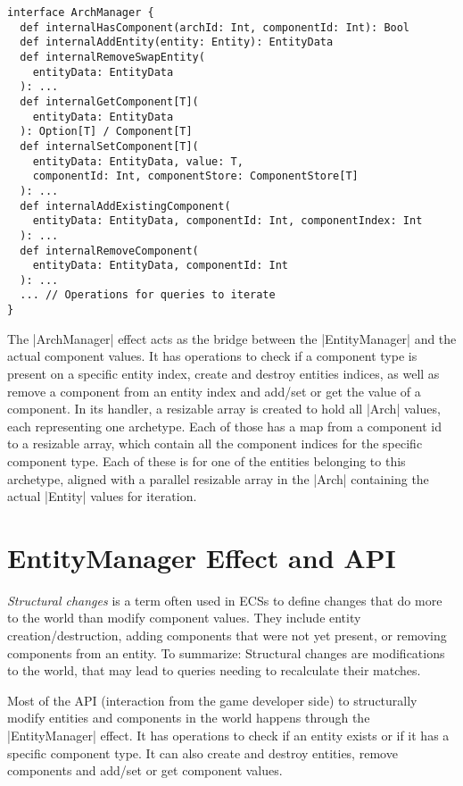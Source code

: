 \begin{lstlisting}[caption=ArchManager signature]
interface ArchManager {
  def internalHasComponent(archId: Int, componentId: Int): Bool
  def internalAddEntity(entity: Entity): EntityData
  def internalRemoveSwapEntity(
    entityData: EntityData
  ): ...
  def internalGetComponent[T](
    entityData: EntityData
  ): Option[T] / Component[T]
  def internalSetComponent[T](
    entityData: EntityData, value: T,
	componentId: Int, componentStore: ComponentStore[T]
  ): ...
  def internalAddExistingComponent(
    entityData: EntityData, componentId: Int, componentIndex: Int
  ): ...
  def internalRemoveComponent(
    entityData: EntityData, componentId: Int
  ): ...
  ... // Operations for queries to iterate
}
\end{lstlisting}

The |ArchManager| effect acts as the bridge between the |EntityManager| and the actual component values. It has operations to check if a component type is present on a specific entity index, create and destroy entities indices, as well as remove a component from an entity index and add/set or get the value of a component. In its handler, a resizable array is created to hold all |Arch| values, each representing one archetype. Each of those has a map from a component id to a resizable array, which contain all the component indices for the specific component type. Each of these is for one of the entities belonging to this archetype, aligned with a parallel resizable array in the |Arch| containing the actual |Entity| values for iteration.

\section{EntityManager Effect and API}\label{sec:entitymanager}

\textit{Structural changes} is a term often used in ECSs to define changes that do more to the world than modify component values. They include entity creation/destruction, adding components that were not yet present, or removing components from an entity. To summarize: Structural changes are modifications to the world, that may lead to queries needing to recalculate their matches.

Most of the API (interaction from the game developer side) to structurally modify entities and components in the world happens through the |EntityManager| effect. It has operations to check if an entity exists or if it has a specific component type. It can also create and destroy entities, remove components and add/set or get component values.

